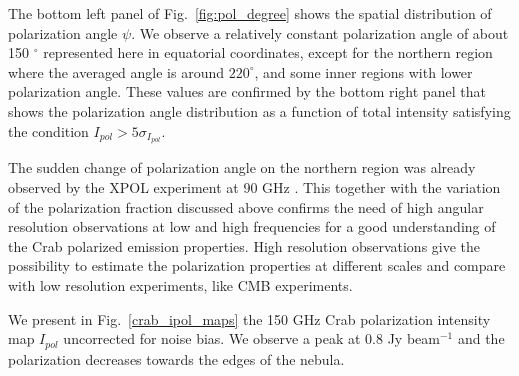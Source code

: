 \documentclass[twocolumn,traditabstract]{aa}
\begin{document}
The bottom left panel of Fig.~\ref{fig:pol_degree} shows the spatial distribution of polarization angle
$\psi$.  We observe a relatively constant polarization
angle of about 150 $^{\circ}$ represented here in equatorial coordinates, except
for the northern region where the averaged angle is around $220^{\circ}$, and
some inner regions with lower polarization angle.  These values are confirmed by
the bottom right panel that shows the polarization angle distribution as a
function of total intensity satisfying the condition $I_{pol} > 5\sigma_{I_{pol}}$.

The sudden change of polarization angle on the northern region was already
observed by the XPOL experiment at 90 GHz \citep{aumont2010}.  This together
with the variation of the polarization fraction discussed above confirms the
need of high angular resolution observations at low and high frequencies for a
good understanding of the Crab polarized emission properties.
High resolution observations give the possibility to estimate the polarization properties at different scales and compare with low resolution experiments, like CMB experiments.

We present in Fig.~\ref{crab_ipol_maps} the 150 GHz Crab polarization intensity
map $I_{pol}$ uncorrected for noise bias. We observe a peak at 0.8 Jy beam$^{-1}$ and the polarization
decreases towards the edges of the nebula.
\end{document}
